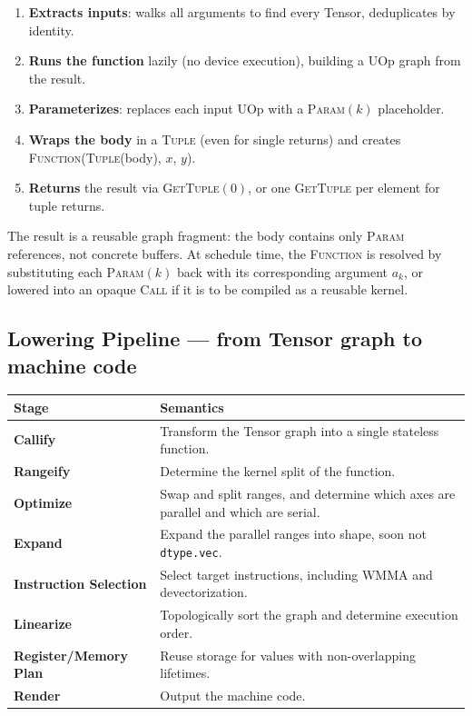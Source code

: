 \documentclass[10pt,letterpaper]{article}
\newcommand{\op}[1]{\textsc{#1}}
\begin{document}
\begin{enumerate}[leftmargin=1.5em, itemsep=2pt]
  \item \textbf{Extracts inputs}: walks all arguments to find every Tensor, deduplicates by identity.
  \item \textbf{Runs the function} lazily (no device execution), building a UOp graph from the result.
  \item \textbf{Parameterizes}: replaces each input UOp with a \op{Param}$(k)$ placeholder.
  \item \textbf{Wraps the body} in a \op{Tuple} (even for single returns) and creates\\
        \op{Function}(\op{Tuple}(body), $x$, $y$).
  \item \textbf{Returns} the result via \op{GetTuple}$(0)$, or one \op{GetTuple} per element for tuple returns.
\end{enumerate}

The result is a reusable graph fragment: the body contains only \op{Param} references, not concrete buffers. At schedule time, the \op{Function} is resolved by substituting each \op{Param}$(k)$ back with its corresponding argument $a_k$, or lowered into an opaque \op{Call} if it is to be compiled as a reusable kernel.

\subsection*{Lowering Pipeline \normalfont\small--- from Tensor graph to machine code}

\begin{tabular}{@{}l p{9.7cm}@{}}
\toprule
\textbf{Stage} & \textbf{Semantics} \\
\midrule
\textbf{Callify} & Transform the Tensor graph into a single stateless function. \\
\textbf{Rangeify} & Determine the kernel split of the function. \\
\textbf{Optimize} & Swap and split ranges, and determine which axes are parallel and which are serial. \\
\textbf{Expand} & Expand the parallel ranges into shape, soon not \texttt{dtype.vec}. \\
\textbf{Instruction Selection} & Select target instructions, including WMMA and devectorization. \\
\textbf{Linearize} & Topologically sort the graph and determine execution order. \\
\textbf{Register/Memory Plan} & Reuse storage for values with non-overlapping lifetimes. \\
\textbf{Render} & Output the machine code. \\
\bottomrule
\end{tabular}
\end{document}
